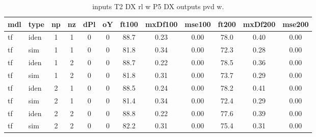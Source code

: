 \begin{center} 
\begin{longtable}{ll|cccc|ccc|ccc} 
\caption[inputs T2 DX rl w P5 DX   outputs pvd w]{inputs T2 DX rl w P5 DX   outputs pvd w.} 
\label{tab:inputs_T2_DX_rl_w_P5_DX___outputs_pvd_w} 
\hline 
  mdl & type & np & nz & dPl & oY & ft100 & mxDf100 & mse100 & ft200 & mxDf200 & mse200 \\ 
 \hline 
tf  & iden & 1 & 1 & 0 & 0 & 88.7 & 0.23 & 0.00 & 78.0 & 0.40 & 0.00 \\ 
tf  & sim & 1 & 1 & 0 & 0 & 81.8 & 0.34 & 0.00 & 72.3 & 0.28 & 0.00 \\ 
 \hline 
tf  & iden & 1 & 2 & 0 & 0 & 88.7 & 0.22 & 0.00 & 78.5 & 0.36 & 0.00 \\ 
tf  & sim & 1 & 2 & 0 & 0 & 81.8 & 0.31 & 0.00 & 73.7 & 0.29 & 0.00 \\ 
 \hline 
tf  & iden & 2 & 1 & 0 & 0 & 88.5 & 0.24 & 0.00 & 78.2 & 0.41 & 0.00 \\ 
tf  & sim & 2 & 1 & 0 & 0 & 81.4 & 0.34 & 0.00 & 72.4 & 0.29 & 0.00 \\ 
 \hline 
tf  & iden & 2 & 2 & 0 & 0 & 88.8 & 0.22 & 0.00 & 77.6 & 0.39 & 0.00 \\ 
tf  & sim & 2 & 2 & 0 & 0 & 82.2 & 0.31 & 0.00 & 75.4 & 0.31 & 0.00 \\ 
 \hline 
\end{longtable} 
\end{center}